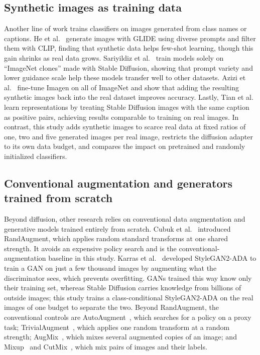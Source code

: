 \subsection{Synthetic images as training data}
Another line of work trains classifiers on images generated from class names or captions. He et al.~\cite{he2023synthetic} generate images with GLIDE using diverse prompts and filter them with CLIP, finding that synthetic data helps few-shot learning, though this gain shrinks as real data grows. Sariyildiz et al.~\cite{sariyildiz2023fake} train models solely on ``ImageNet clones'' made with Stable Diffusion, showing that prompt variety and lower guidance scale help these models transfer well to other datasets. Azizi et al.~\cite{azizi2023synthetic} fine-tune Imagen on all of ImageNet and show that adding the resulting synthetic images back into the real dataset improves accuracy. Lastly, Tian et al.~\cite{tian2023stablerep} learn representations by treating Stable Diffusion images with the same caption as positive pairs, achieving results comparable to training on real images. In contrast, this study adds synthetic images to scarce real data at fixed ratios of one, two and five generated images per real image, restricts the diffusion adapter to its own data budget, and compares the impact on pretrained and randomly initialized classifiers.

\subsection{Conventional augmentation and generators trained from scratch}
Beyond diffusion, other research relies on conventional data augmentation and generative models trained entirely from scratch. Cubuk et al.~\cite{cubuk2020randaugment} introduced RandAugment, which applies random standard transforms at one shared strength. It avoids an expensive policy search and is the conventional-augmentation baseline in this study. Karras et al.~\cite{karras2020training} developed StyleGAN2-ADA to train a GAN on just a few thousand images by augmenting what the discriminator sees, which prevents overfitting. GANs trained this way know only their training set, whereas Stable Diffusion carries knowledge from billions of outside images; this study trains a class-conditional StyleGAN2-ADA on the real images of one budget to separate the two. Beyond RandAugment, the conventional controls are AutoAugment~\cite{cubuk2019autoaugment}, which searches for a policy on a proxy task; TrivialAugment~\cite{muller2021trivialaugment}, which applies one random transform at a random strength; AugMix~\cite{hendrycks2020augmix}, which mixes several augmented copies of an image; and Mixup~\cite{zhang2018mixup} and CutMix~\cite{yun2019cutmix}, which mix pairs of images and their labels.


